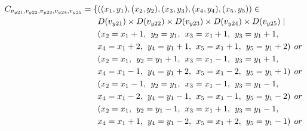 \begin{equation}
\begin{aligned}
\Cons{y21}{y22}{y23}{y24}{y25}=\{&((x_{1},y_{1}),(x_{2},y_{2}),(x_{3},y_{3}),(x_{4},y_{4}),(x_{5},y_{5}))\in \\
&\Domain {y21} \times \Domain{y22}\times \Domain{y23}\times \Domain{y24}\times \Domain{y25} \mid\\
&(x_{2} = x_{1} + 1,\hspace{1ex}y_{2} = y_{1},\hspace{1ex}x_{3} = x_{1}+1,\hspace{1ex}y_{3} = y_{1}+1,
\\&x_{4} = x_{1}+2,\hspace{1ex}y_{4} = y_{1}+1,\hspace{1ex}x_{5} = x_{1}+1,\hspace{1ex}y_{5} = y_{1}+2)\hspace{1ex} or \\
&(x_{2} = x_{1} ,\hspace{1ex}y_{2} = y_{1}+1,\hspace{1ex}x_{3} = x_{1}-1,\hspace{1ex}y_{3} = y_{1}+1,
\\&x_{4} = x_{1}-1,\hspace{1ex}y_{4} = y_{1}+2,\hspace{1ex}x_{5} = x_{1}-2,\hspace{1ex}y_{5} = y_{1}+1)\hspace{1ex} or \\
&(x_{2} = x_{1}-1 ,\hspace{1ex}y_{2} = y_{1},\hspace{1ex}x_{3} = x_{1}-1,\hspace{1ex}y_{3} = y_{1}-1,
\\&x_{4} = x_{1}-2,\hspace{1ex}y_{4} = y_{1}-1,\hspace{1ex}x_{5} = x_{1}-1,\hspace{1ex}y_{5} = y_{1}-2)\hspace{1ex} or \\
&(x_{2} = x_{1} ,\hspace{1ex}y_{2} = y_{1}-1,\hspace{1ex}x_{3} = x_{1}+1,\hspace{1ex}y_{3} = y_{1}-1,
\\&x_{4} = x_{1}+1,\hspace{1ex}y_{4} = y_{1}-2,\hspace{1ex}x_{5} = x_{1}+2,\hspace{1ex}y_{5} = y_{1}-1)\hspace{1ex} or \\

\end{aligned}
\end{equation}
